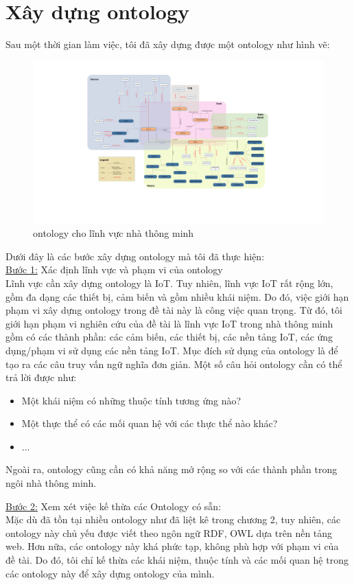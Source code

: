 \section{Xây dựng ontology}
Sau một thời gian làm việc, tôi đã xây dựng được một ontology như hình vẽ:

\clearpage
\begin{figure}[h!]
	\center
	\includegraphics[scale=0.2, center]{image/ontology-2}
	\caption{ontology cho lĩnh vực nhà thông minh}
\end{figure}


Dưới đây là các bước xây dựng ontology mà tôi đã thực hiện:\\
\underline{Bước 1:} Xác định lĩnh vực và phạm vi của ontology \\
Lĩnh vực cần xây dựng ontology là IoT. Tuy nhiên, lĩnh vực IoT rất rộng lớn, gồm đa dạng các thiết bị, cảm biến và gồm nhiều khái niệm. Do đó, việc giới hạn phạm vi xây dựng ontology trong đề tài này là công việc quan trọng. Từ đó, tôi giới hạn phạm vi nghiên cứu của đề tài là lĩnh vực IoT trong nhà thông minh gồm có các thành phần: các cảm biến, các thiết bị, các nền tảng IoT, các ứng dụng/phạm vi sử dụng các nền tảng IoT. 
Mục đích sử dụng của ontology là để tạo ra các câu truy vấn ngữ nghĩa đơn giản. Một số câu hỏi ontology cần có thể trả lời được như:
\begin{itemize}
	\item Một khái niệm có những thuộc tính tương ứng nào?
	\item Một thực thể có các mối quan hệ với các thực thể nào khác?
	\item ...
\end{itemize}
Ngoài ra, ontology cũng cần có khả năng mở rộng so với các thành phần trong ngôi nhà thông minh. 

\underline{Bước 2:} Xem xét việc kế thừa các Ontology có sẵn: \\
Mặc dù đã tồn tại nhiều ontology như đã liệt kê trong chương 2, tuy nhiên, các ontology này chủ yếu được viết theo ngôn ngữ RDF, OWL dựa trên nền tảng web. Hơn nữa, các ontology này khá phức tạp, không phù hợp với phạm vi của đề tài. Do đó, tôi chỉ kế thừa các khái niệm, thuộc tính và các mối quan hệ trong các ontology này để xây dựng ontology của mình.

